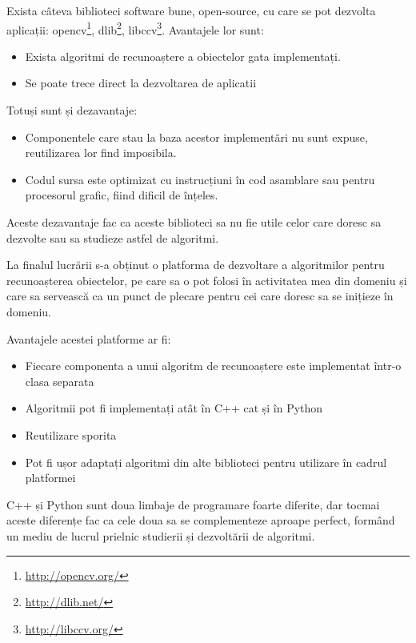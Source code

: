 Exista câteva biblioteci software bune, open-source, cu care se pot dezvolta aplicații: 
opencv\footnote{\url{http://opencv.org/}}, 
dlib\footnote{\url{http://dlib.net/}}, 
libccv\footnote{\url{http://libccv.org/}}.
Avantajele lor sunt:
\begin{itemize}
	\item Exista algoritmi de recunoaștere a obiectelor gata implementați.
	\item Se poate trece direct la dezvoltarea de aplicatii
\end{itemize}
Totuși sunt și dezavantaje:
\begin{itemize}
	\item Componentele care stau la baza acestor implementări nu sunt expuse, reutilizarea lor find imposibila.
	\item Codul sursa este optimizat cu instrucțiuni în cod asamblare sau pentru procesorul grafic, fiind dificil de înțeles.
\end{itemize}
Aceste dezavantaje fac ca aceste biblioteci sa nu fie utile celor care doresc sa dezvolte sau sa studieze astfel de algoritmi.

La finalul lucrării s-a obținut o platforma de dezvoltare a algoritmilor pentru recunoașterea obiectelor, pe care sa o pot folosi în activitatea mea din domeniu și care sa servească ca un punct de plecare pentru cei care doresc sa se inițieze în domeniu.

Avantajele acestei platforme ar fi:
\begin{itemize}
	\item Fiecare componenta a unui algoritm de recunoaștere este implementat într-o clasa separata
	\item Algoritmii pot fi implementați atât în C++ cat și în Python
	\item Reutilizare sporita
	\item Pot fi ușor adaptați algoritmi din alte biblioteci pentru utilizare în cadrul platformei
\end{itemize}

C++ și Python sunt doua limbaje de programare foarte diferite, dar tocmai aceste diferențe fac ca cele doua sa se complementeze aproape perfect, formând un mediu de lucrul prielnic studierii și dezvoltării de algoritmi.


